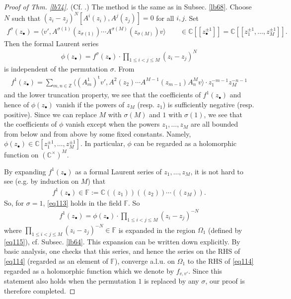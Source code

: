 \documentclass[11pt,b5paper,notitlepage]{article}
\theoremstyle{definition}
\theoremstyle{plain}
\newcommand{\tr}{\mathrm{t}} %
\newcommand{\bk}[1]{\langle {#1}\rangle}
\newcommand{\bigbk}[1]{\big\langle {#1}\big\rangle}
\newcommand{\mbb}{\mathbb}
\newcommand{\blt}{\bullet}
\newcommand{\Cbb}{\mathbb C}
\newcommand{\Zbb}{\mathbb Z}
\numberwithin{equation}{section}
\begin{document}
\begin{proof}[Proof of Thm. \ref{lb74}] (Cf. \cite{FHL93}.)
The method is the same as in Subsec. \ref{lb68}. Choose $N$ such that $(z_i-z_j)^N[A^i(z_i),A^j(z_j)]=0$ for all $i,j$. Set
\begin{align}
f^\sigma(z_\blt)=\bigbk{v',A^{\sigma(1)}(z_{\sigma(1)})\cdots A^{\sigma(M)}(z_{\sigma(M)})v}\qquad\in\Cbb[[z_\blt^{\pm1}]]=\Cbb[[z_1^{\pm1},\dots,z_M^{\pm1}]].	
\end{align}
Then the formal Laurent series
\begin{align}
\phi(z_\blt)=f^\sigma(z_\blt)	\cdot \prod_{1\leq i<j\leq M}(z_i-z_j)^N\label{eq113}
\end{align}
is independent of the permutation $\sigma$. From
\begin{align*}
f^1(z_\blt)=\sum_{m,n\in\Zbb}\bk{(A^1_m)^\tr v',A^2(z_2)\cdots A^{M-1}(z_{m-1})A^M_nv}\cdot z_1^{-m-1}z_M^{-n-1}
\end{align*}
and the lower truncation property, we see that the coefficients of $f^1(z_\blt)$ and hence of $\phi(z_\blt)$ vanish if the powers of $z_M$ (resp. $z_1$) is sufficiently negative (resp. positive). Since we can replace $M$ with $\sigma(M)$ and $1$ with $\sigma(1)$, we see that the coefficients of $\phi$ vanish except when the powers $z_1,\dots,z_M$ are all bounded from below and from above by some fixed constants. Namely, $\phi(z_\blt)\in\Cbb[z_1^{\pm1},\dots,z_M^{\pm1}]$. In particular, $\phi$ can be regarded as a holomorphic function on $(\Cbb^\times)^M$.

By expanding $f^1(z_\blt)$ as a formal Laurent series of $z_1,\dots,z_M$, it is not hard to see (e.g. by induction on $M$) that
\begin{align}
	f^1(z_\blt)\in\mbb F:=\Cbb((z_1))((z_2))\cdots((z_M)).
\end{align}
So, for $\sigma=1$, \eqref{eq113} holds in the field $\mbb F$. So
\begin{align}
f^1(z_\blt)=\phi(z_\blt)\cdot\prod_{1\leq i<j\leq M}(z_i-z_j)^{-N}	\label{eq114}
\end{align}
where $\prod_{1\leq i<j\leq M}(z_i-z_j)^{-N}\in\mbb F$ is expanded in the region $\Omega_1$ (defined by \eqref{eq115}), cf. Subsec. \ref{lb64}. This expansion can be written down explicitly. By basic analysis, one checks that this series, and hence the series on the RHS of \eqref{eq114} (regarded as an element of $\mbb F$), converge a.l.u. on $\Omega_1$ to the RHS of \eqref{eq114} regarded as a holomorphic function which we denote by $f_{v,v'}$. Since this statement also holds when the permutation $1$ is replaced by any $\sigma$, our proof is therefore completed.
\end{proof}
\end{document}
